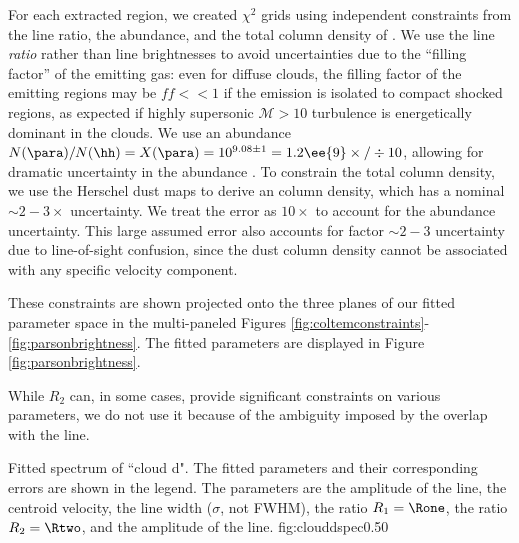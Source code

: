 For each extracted region, we created $\chi^2$ grids using independent
constraints from the line ratio, the \formaldehyde abundance, and the total
column density of \hh.  We use the line \emph{ratio} rather than line
brightnesses to avoid uncertainties due to the ``filling factor'' of the
emitting gas: even for diffuse clouds, the filling factor of the emitting
regions may be $ff<<1$ if the emission is isolated to compact shocked regions,
as expected if highly supersonic $\mathcal{M}>10$ turbulence is energetically
dominant in the clouds.  We use an abundance $N(\para)/N(\hh) = X(\para) =
10^{9.08\pm1} = 1.2\ee{9} \times/\div 10$, allowing for dramatic uncertainty in
the \formaldehyde abundance
\citep{Ginsburg2013a,Carey1998a,Wootten1978a,Mundy1987a}.  To constrain the
total column density, we use the Herschel dust maps to derive an \hh column
density, which has a nominal $\sim2-3\times$ uncertainty.  We treat the error
as $10\times$ to account for the abundance uncertainty.  This large assumed
error also accounts for factor $\sim2-3$ uncertainty due to line-of-sight
confusion, since the dust column density cannot be associated with any specific
velocity component.

These constraints are shown projected onto the three planes of our fitted
parameter space in the multi-paneled Figures
\ref{fig:coltemconstraints}-\ref{fig:parsonbrightness}.  The fitted parameters
are displayed in Figure \ref{fig:parsonbrightness}.

While $R_2$ can, in some cases, provide significant constraints on various
parameters, we do not use it because of the ambiguity imposed by the overlap
with the \methanol \fourtwotwo line.

{Fitted spectrum of ``cloud d".  The fitted parameters and their corresponding
errors are shown in the legend.  The parameters are the amplitude of the
\formaldehyde \threeohthree line, the centroid velocity, the line width
($\sigma$, not FWHM), the ratio $R_1 = \Rone$,
the ratio $R_2 = \Rtwo$, and the amplitude of
the \methanol \fourtwotwo line.  }
{fig:clouddspec}{0.5}{0}

